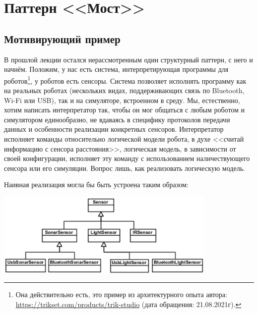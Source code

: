 \documentclass{../../text-style}
\begin{document}
\maketitle
\thispagestyle{empty}

\section{Паттерн <<Мост>>}

\subsection{Мотивирующий пример}

В прошлой лекции остался нерассмотренным один структурный паттерн, с него и начнём. Положим, у нас есть система, интерпретирующая программы для роботов\footnote{Она действительно есть, это пример из архитектурного опыта автора: \url{https://trikset.com/products/trik-studio} (дата обращения: 21.08.2021г).}, у роботов есть сенсоры. Система позволяет исполнять программу как на реальных роботах (нескольких видах, поддерживающих связь по Bluetooth, Wi-Fi или USB), так и на симуляторе, встроенном в среду. Мы, естественно, хотим написать интерпретатор так, чтобы он мог общаться с любым роботом и симулятором единообразно, не вдаваясь в специфику протоколов передачи данных и особенности реализации конкретных сенсоров. Интерпретатор исполняет команды относительно логической модели робота, в духе <<считай информацию с сенсора расстояния>>, логическая модель, в зависимости от своей конфигурации, исполняет эту команду с использованием наличествующего сенсора или его симуляции. Вопрос лишь, как реализовать логическую модель.

Наивная реализация могла бы быть устроена таким образом:

\begin{center}
    \includegraphics[width=0.8\textwidth]{noBridge.png}
\end{center}
\end{document}
